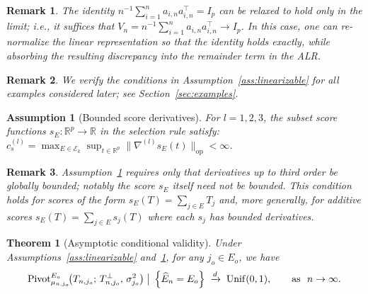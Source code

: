 \documentclass[12pt]{article}
\newcommand{\Pivot}{\text{\normalfont Pivot}}
\newcommand{\op}{\mathrm{op}}
\newtheorem{theorem}{Theorem}[section]
\newtheorem{remark}{Remark}
\newtheorem{assumption}{Assumption}
\newcommand{\real}{\mathbb{R}}
\newcommand{\Ee}{{\mathbb{E}}}
\begin{document}
\begin{remark}
The identity $n^{-1}\sum_{i=1}^n a_{i,n}a_{i,n}^\top=I_p$ can be relaxed to hold only in the limit; i.e., it suffices that $V_n = n^{-1}\sum_{i=1}^n a_{i,n}a_{i,n}^\top \to I_p$.
In this case, one can re-normalize the linear representation so that the identity holds exactly, while absorbing the resulting discrepancy into the remainder term in the ALR.
\end{remark}


\begin{remark}
    We verify the conditions in Assumption~\ref{ass:linearizable} for all examples considered later; see Section~\ref{sec:examples}.
\end{remark}


\begin{assumption}[Bounded score derivatives]
\label{ass:score-deriv}
For $l=1,2,3$, the subset score functions $s_E:\real^p\to\real$ in the selection rule satisfy: $c_s^{(l)}
  =\max_{E\in\mathcal E_k}\sup_{t\in\real^p}
   \|\nabla^{(l)}s_E(t)\|_{\op}<\infty$.
\end{assumption}

\begin{remark}
Assumption~\ref{ass:score-deriv} requires only that derivatives up to third order be globally bounded; notably the score $s_E$ itself need not be bounded. This condition holds for scores of the form $s_E(T)=\sum_{j\in E} T_j$ and, more generally, for additive scores $s_E(T)=\sum_{j\in E}s_j(T)$ where each $s_j$ has bounded derivatives.
\end{remark}


\begin{theorem}[Asymptotic conditional validity]
\label{thm:asymp-main}
Under Assumptions~\ref{ass:linearizable} and~\ref{ass:score-deriv}, for any $j_o\in E_o$, we have
\begin{align*}
  \Pivot^{E_o}_{\mu_{n,j_{o}}}\!\big(T_{n, j_{o}};\,T^\perp_{n, j_{o}},\,
    \sigma_{j_o}^2\big)
  \;\big|\;\left\{\widehat E_n=E_o\right\}
  \;\xrightarrow{d}\;
  \mathrm{Unif}(0,1),
  \qquad \text{as } \ n\to\infty.
\end{align*}
\end{theorem} 
\end{document}
